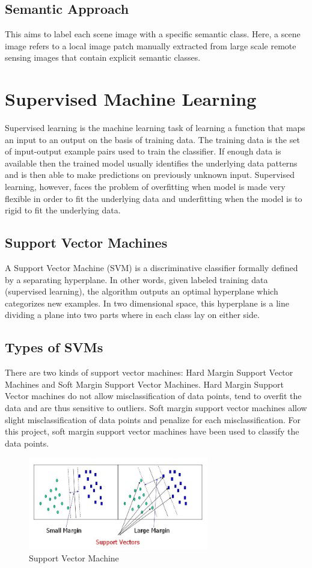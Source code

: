 \documentclass[12pt, a4paper]{report}
\begin{document}
\subsection{Semantic Approach}
This aims to label each scene image with a specific semantic class. Here, a scene image refers to a local image patch manually extracted from large scale remote sensing images that contain explicit semantic classes.\cite{eyesky}

\section{Supervised Machine Learning}
Supervised learning is the machine learning task of learning a function that maps an input to an output on the basis of training data.\cite{supervisedlearningone, supervisedlearningtwo} The training data is the set of input-output example pairs used to train the classifier. If enough data is available then the trained model usually identifies the underlying data patterns and is then able to make predictions on previously unknown input. Supervised learning, however, faces the problem of overfitting when model is made very flexible in order to fit the underlying data and underfitting when the model is to rigid to fit the underlying data.
\subsection{Support Vector Machines}
A Support Vector Machine (SVM) is a discriminative classifier formally defined by a separating hyperplane. In other words, given labeled training data (supervised learning), the algorithm outputs an optimal hyperplane which categorizes new examples. In two dimensional space, this hyperplane is a line dividing a plane into two parts where in each class lay on either side.\cite{supportvectormachines}
\subsection{Types of SVMs}
There are two kinds of support vector machines: Hard Margin Support Vector Machines and Soft Margin Support Vector Machines.
Hard Margin Support Vector machines do not allow misclassification of data points, tend to overfit the data and are thus sensitive to outliers. Soft margin support vector machines allow slight misclassification of data points and penalize for each misclassification.
For this project, soft margin support vector machines have been used to classify the data points.
\begin{figure}[h]
\centering
\includegraphics[width=0.7\textwidth]{supportvectormachines.jpg}
\caption{Support Vector Machine}
\end{figure}
\end{document}
